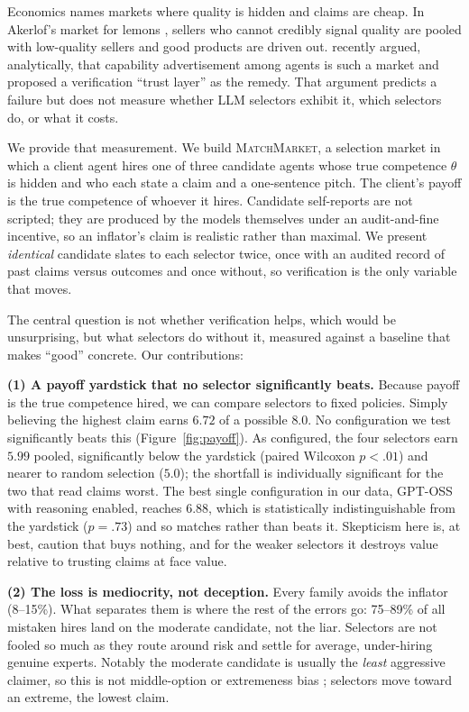 \documentclass[11pt]{article}
\begin{document}
Economics names markets where quality is hidden and claims are cheap. In Akerlof's
market for lemons \cite{akerlof1970lemons}, sellers who cannot credibly signal quality
\cite{spence1973signaling} are pooled with low-quality sellers and good products are
driven out. \citet{mittal2026capability} recently argued, analytically, that capability
advertisement among agents is such a market and proposed a verification ``trust layer''
as the remedy. That argument predicts a failure but does not measure whether LLM
selectors exhibit it, which selectors do, or what it costs.

We provide that measurement. We build \textsc{MatchMarket}, a selection market in which
a client agent hires one of three candidate agents whose true competence $\theta$ is
hidden and who each state a claim and a one-sentence pitch. The client's payoff is the
true competence of whoever it hires. Candidate self-reports are not scripted; they are
produced by the models themselves under an audit-and-fine incentive, so an
inflator's claim is realistic rather than maximal. We present \emph{identical}
candidate slates to each selector twice, once with an audited record of past claims
versus outcomes and once without, so verification is the only variable that moves.

The central question is not whether verification helps, which would be unsurprising, but
what selectors do without it, measured against a baseline that makes ``good'' concrete.
Our contributions:

\noindent\textbf{(1) A payoff yardstick that no selector significantly beats.} Because
payoff is the true competence hired, we can compare selectors to fixed policies. Simply
believing the highest claim earns $6.72$ of a possible $8.0$. No configuration we test
significantly beats this (Figure~\ref{fig:payoff}). As configured, the four selectors earn
$5.99$ pooled, significantly below the yardstick (paired Wilcoxon $p{<}.01$) and nearer to
random selection ($5.0$); the shortfall is individually significant for the two that read
claims worst. The best single configuration in our data, GPT-OSS with reasoning enabled,
reaches $6.88$, which is statistically indistinguishable from the yardstick
($p{=}.73$) and so matches rather than beats it. Skepticism here is, at best, caution that
buys nothing, and for the weaker selectors it destroys value relative to trusting claims at
face value.

\noindent\textbf{(2) The loss is mediocrity, not deception.} Every family avoids the
inflator (8--15\%). What separates them is where the rest of the errors go: 75--89\% of
all mistaken hires land on the moderate candidate, not the liar. Selectors are not
fooled so much as they route around risk and settle for average, under-hiring genuine
experts. Notably the moderate candidate is usually the \emph{least} aggressive claimer,
so this is not middle-option or extremeness bias \cite{tjuatja2024biases}; selectors
move toward an extreme, the lowest claim.
\end{document}
